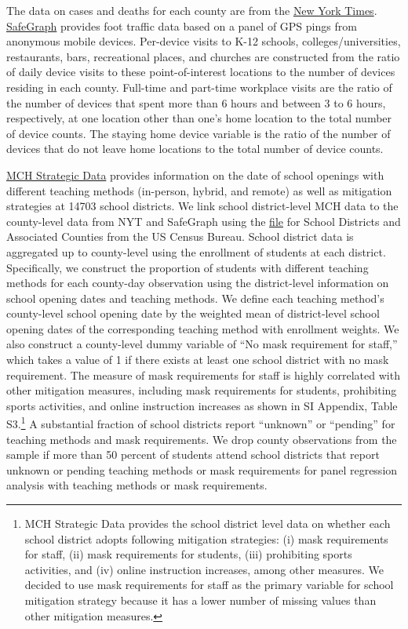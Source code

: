 \documentclass[9pt,twocolumn,twoside,lineno]{pnas-new}
\begin{document}
The data on cases and deaths for each county are from the \href{https://raw.githubusercontent.com/nytimes/covid-19-data/master/us-counties.csv}{New York Times}.  \href{https://www.safegraph.com}{SafeGraph} provides foot traffic data based on a panel of GPS pings from anonymous mobile devices. Per-device visits to K-12 schools, colleges/universities, restaurants, bars, recreational places, and churches are constructed from the ratio of
daily device visits to these point-of-interest locations to the number of devices residing in each county. Full-time and part-time workplace visits are the ratio of the number of devices that spent more than 6 hours and between 3 to 6 hours, respectively, at one location other than one's home location to the total number of device counts. The staying home device variable is the ratio of the number of devices that do not leave home locations to the total number of device counts.

 \href{https://www.mchdata.com}{MCH Strategic Data} provides information on the date of school openings with different teaching methods (in-person, hybrid, and remote) as well as mitigation strategies at 14703 school districts. We link school district-level MCH data to the county-level data from NYT and SafeGraph using the \href{https://www2.census.gov/programs-surveys/saipe/guidance-geographies/districts-counties/sdlist-20.xls}{file} for School Districts and Associated Counties from the US Census Bureau. School district data is aggregated up to county-level using the enrollment of students at each district. Specifically, we construct the proportion of students with different teaching methods for each county-day observation using the district-level information on school opening dates and teaching methods. We define each teaching method's county-level school opening date by the weighted mean of district-level school opening dates of the corresponding teaching method with enrollment weights. We also construct a county-level dummy variable of ``No mask requirement for staff,'' which takes a value of 1 if there exists at least one school district with no mask requirement. The measure of mask requirements for staff is highly correlated with other mitigation measures, including mask requirements for students, prohibiting sports activities, and online instruction increases as shown in SI Appendix, Table S3.\footnote{MCH Strategic Data provides the school district level data on whether each school district adopts following mitigation strategies: (i) mask requirements for staff, (ii) mask requirements for students, (iii) prohibiting sports activities, and (iv) online instruction increases, among other measures.  We decided to use mask requirements for staff as the primary variable for school mitigation strategy because it has a lower number of missing values than other mitigation measures.}
 A substantial fraction of school districts report ``unknown'' or ``pending''  for teaching methods and mask requirements. We drop county observations from the sample if more than 50 percent of students attend school districts that report unknown or pending teaching methods or mask requirements for panel regression analysis with teaching methods or mask requirements.
   
\end{document}
